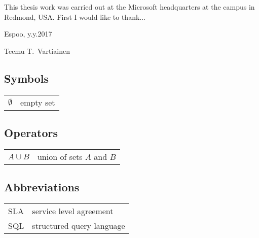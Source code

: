 \documentclass[english,12pt,a4paper,pdftex,sci,utf8]{aaltothesis}
\begin{document}

This thesis work was carried out at the Microsoft headquarters at the campus in Redmond, USA.
First I would like to thank...


\vspace{5cm}
Espoo, y.y.2017

\vspace{5mm}
{\hfill Teemu T.\ Vartiainen \hspace{1cm}}

\newpage


\thesistableofcontents



\subsection*{Symbols}

\begin{tabular}{ll}
$\emptyset$  & empty set \\
\end{tabular}

\subsection*{Operators}

\begin{tabular}{ll}
$A \cup B$    & union of sets $A$ and $B$ \\
\end{tabular}

\subsection*{Abbreviations}

\begin{tabular}{ll}
SLA         & service level agreement \\
SQL         & structured query language
\end{tabular}


\cleardoublepage
\storeinipagenumber
{}
\setcounter{page}{1}
\end{document}
